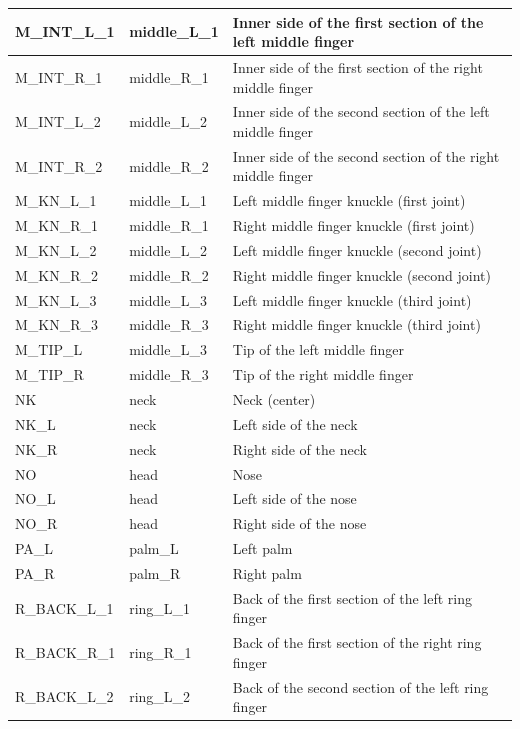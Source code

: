 \documentclass[../main.tex]{subfiles}
\begin{document}
\begin{longtable}{|p{2cm}|p{3cm}|p{5cm}|}
    M\_INT\_L\_1 & middle\_L\_1 & Inner side of the first section of the left middle finger \\ \hline
    M\_INT\_R\_1 & middle\_R\_1 & Inner side of the first section of the right middle finger \\ \hline
    M\_INT\_L\_2 & middle\_L\_2 & Inner side of the second section of the left middle finger \\ \hline
    M\_INT\_R\_2 & middle\_R\_2 & Inner side of the second section of the right middle finger \\ \hline
    M\_KN\_L\_1 & middle\_L\_1 & Left middle finger knuckle (first joint) \\ \hline
    M\_KN\_R\_1 & middle\_R\_1 & Right middle finger knuckle (first joint) \\ \hline
    M\_KN\_L\_2 & middle\_L\_2 & Left middle finger knuckle (second joint) \\ \hline
    M\_KN\_R\_2 & middle\_R\_2 & Right middle finger knuckle (second joint) \\ \hline
    M\_KN\_L\_3 & middle\_L\_3 & Left middle finger knuckle (third joint) \\ \hline
    M\_KN\_R\_3 & middle\_R\_3 & Right middle finger knuckle (third joint) \\ \hline
    M\_TIP\_L & middle\_L\_3 & Tip of the left middle finger \\ \hline
    M\_TIP\_R & middle\_R\_3 & Tip of the right middle finger \\ \hline
    NK & neck & Neck (center) \\ \hline
    NK\_L & neck & Left side of the neck \\ \hline
    NK\_R & neck & Right side of the neck \\ \hline
    NO & head & Nose \\ \hline
    NO\_L & head & Left side of the nose \\ \hline
    NO\_R & head & Right side of the nose \\ \hline
    PA\_L & palm\_L & Left palm \\ \hline
    PA\_R & palm\_R & Right palm \\ \hline
    R\_BACK\_L\_1 & ring\_L\_1 & Back of the first section of the left ring finger \\ \hline
    R\_BACK\_R\_1 & ring\_R\_1 & Back of the first section of the right ring finger \\ \hline
    R\_BACK\_L\_2 & ring\_L\_2 & Back of the second section of the left ring finger \\ \hline

\end{longtable}
\end{document}
